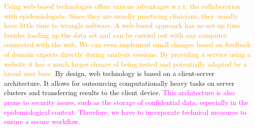 \documentclass[journal]{style/vgtc} 			          %
\newcommand{\design}[1]{\textcolor{orange}{#1}}
\newcommand{\magenta}[1]{\textcolor{magenta}{#1}}
\begin{document}
\design{
Using web-based technologies offers various advantages w.r.t. the collaboration with epidemiologists.
Since they are usually practicing clinicians, they usually have little time to wrangle software.
A web-based approach has no set-up time besides loading up the data set and can be carried out with any computer connected with the web.
We can even implement small changes based on feedback of domain experts directly during analysis sessions. %
By providing a service using a website it has a much larger chance of being tested and potentially adapted by a broad user base.
}
By design, web technology is based on a client-server architecture.
It allows for outsourcing computationally heavy tasks on server clusters and transferring results to the client device.
\magenta{
This architecture is also prone to security issues, such as the storage of confidential data, especially in the epidemiological context.
Therefore, we have to incorporate technical measures to ensure a secure workflow.
}
\end{document}
